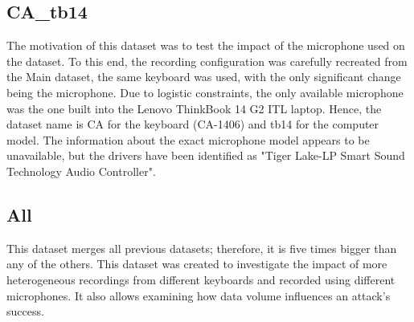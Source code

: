 \documentclass[../main.tex]{subfiles}
\begin{document}
\subsection{CA\_tb14}
\label{sec:dataset_CA_tb14}
The motivation of this dataset was to test the impact of the microphone used on the dataset. To this end, the recording configuration was carefully recreated from the Main dataset, the same keyboard was used, with the only significant change being the microphone. Due to logistic constraints, the only available microphone was the one built into the Lenovo ThinkBook 14 G2 ITL laptop. Hence, the dataset name is CA for the keyboard (CA-1406) and tb14 for the computer model. The information about the exact microphone model appears to be unavailable, but the drivers have been identified as "Tiger Lake-LP Smart Sound Technology Audio Controller".

\subsection{All}
\label{sec:dataset_all}
This dataset merges all previous datasets; therefore, it is five times bigger than any of the others.
This dataset was created to investigate the impact of more heterogeneous recordings from different keyboards and recorded using different microphones. It also allows examining how data volume influences an attack's success. 
\end{document}
